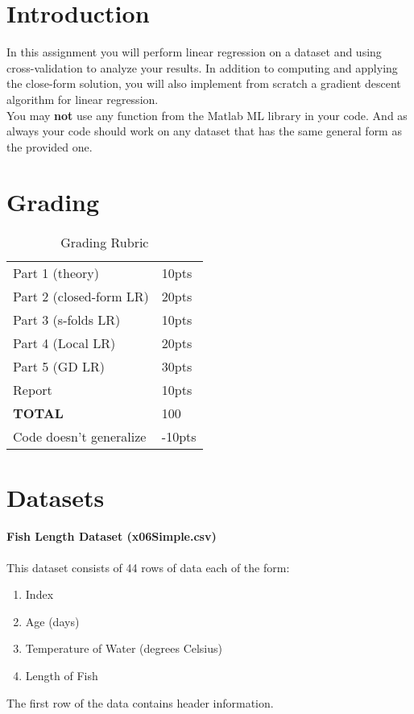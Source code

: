 \documentclass[12pt]{article}
\begin{document}
\maketitle


\section*{Introduction}
In this assignment you will perform linear regression on a dataset and using cross-validation to analyze your results.  In addition to computing and applying the close-form solution, you will also implement from scratch a gradient descent algorithm for linear regression.\\

\noindent
You may \textbf{not} use any function from the Matlab ML library in your code.  And as always your code should work on any dataset that has the same general form as the provided one.

\section*{Grading}
\begin{table}[h]
\begin{center}
\begin{tabular}{|l|l|}
\hline
Part 1 (theory) & 10pts\\
Part 2 (closed-form LR) & 20pts\\
Part 3 (s-folds LR) & 10pts\\
Part 4 (Local LR) & 20pts\\
Part 5 (GD LR) & 30pts\\
Report & 10pts\\
\hline
\textbf{TOTAL} & 100 \\
\hline
Code doesn't generalize & -10pts\\
\hline
\end{tabular}
\caption{Grading Rubric}
\end{center}
\end{table}

\newpage
\section*{Datasets}
\paragraph{Fish Length Dataset  (x06Simple.csv)}
This dataset consists of 44 rows of data each of the form:
\begin{enumerate}
\item Index
\item Age (days)
\item Temperature of Water (degrees Celsius)
\item Length of Fish
\end{enumerate}
The first row of the data contains header information.\\
\end{document}
